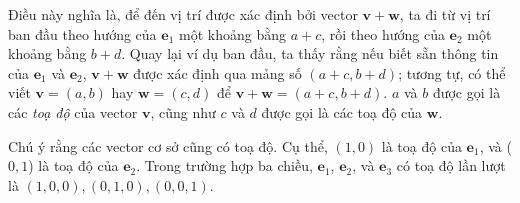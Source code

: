 Điều này nghĩa là, để đến vị trí được xác định bởi vector \(\mathbf{v}+\mathbf{w}\), ta đi từ vị trí ban đầu theo hướng của \(\mathbf{e}_1\) một khoảng bằng \(a+c\), rồi theo hướng của \(\mathbf{e}_2\) một khoảng bằng \(b+d\). Quay lại ví dụ ban đầu, ta thấy rằng nếu biết sẵn thông tin của \(\mathbf{e}_1\) và \(\mathbf{e}_2\), \(\mathbf{v}+\mathbf{w}\) được xác định qua mảng số \((a+c,b+d)\); 
tương tự, có thể viết \(\mathbf{v}=(a,b)\) hay \(\mathbf{w}=(c,d)\) để \(\mathbf{v}+\mathbf{w}=(a+c,b+d)\). \(a\) và \(b\) được gọi là các \emph{toạ độ} của vector \(\mathbf{v}\), cũng như \(c\) và \(d\) được gọi là các toạ độ của \(\mathbf{w}\).
\vspace{8pt}

Chú ý rằng các vector cơ sở cũng có toạ độ. Cụ thể, \((1,0)\) là toạ độ của \(\mathbf{e}_1\), và (\(0,1\)) là toạ độ của \(\mathbf{e}_2\). Trong trường hợp ba chiều, \(\mathbf{e}_1\), \(\mathbf{e}_2\), và \(\mathbf{e}_3\) có toạ độ lần lượt là \((1,0,0), (0,1,0), (0,0,1)\).

